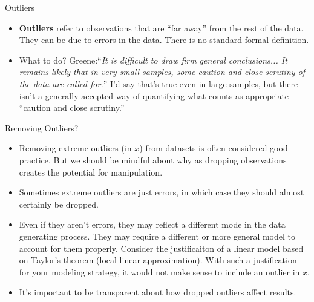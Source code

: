 \begin{frame}{Outliers}
\begin{itemize}
	\item {\bf Outliers} refer to observations that are ``far away'' from the rest of the data. 
	They can be due to errors in the data.  There is no standard formal definition. 

	\medskip
	\item What to do? Greene:``\emph{It is difficult to draw firm general conclusions... It remains likely that in very
	small samples, some caution and close scrutiny of the data are called for.}'' I'd say that's true even in large samples,
	but there isn't a generally accepted way of quantifying what counts as appropriate ``caution and close scrutiny.''


\end{itemize}
\end{frame}


\begin{frame}{Removing Outliers?}
\begin{itemize}
\item Removing extreme outliers (in $x$) from datasets is often considered good practice. But we should be mindful
		about why as dropping observations creates the potential for manipulation. 

	\medskip
	\item Sometimes extreme outliers are just errors, in which case they should almost certainly be dropped.

	\medskip
	\item Even if they aren't errors, they may reflect a different mode in the data generating process. They may require
		a different or more general model to account for them properly. Consider the justificaiton of a linear
		model based on Taylor's theorem (local linear approximation). With such a justification for your modeling
		strategy, it would not make sense to include an outlier in $x$.
	\medskip
	\item It's important to be transparent about how dropped outliers affect results. 

\end{itemize}
\end{frame}




